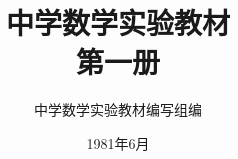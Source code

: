 \documentclass[b5paper, openany, fontset=fandol]{ctexbook}
\theoremstyle{plain}
\begin{document}
\title{\Huge\bfseries 中学数学实验教材\\第一册}



\author{\Large 中学数学实验教材编写组编}
\date{\Large 1981年6月}

\maketitle




\frontmatter


\tableofcontents


\mainmatter

 
 
 
 
 
 
 
\end{document}
